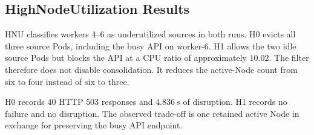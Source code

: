\subsection{HighNodeUtilization Results}
\label{subsec:actualusage4_hnu_results}
\begin{table}[H]
    \centering
    \caption{HighNodeUtilization Results}
    \label{tab:actualusage4_hnu}
    \renewcommand{\arraystretch}{1.2}
\end{table}

HNU classifies workers 4--6 as underutilized sources in both runs. H0 evicts all three source Pods, including the busy API on worker-6. H1 allows the two idle source Pods but blocks the API at a CPU ratio of approximately \(10.02\). The filter therefore does not disable consolidation. It reduces the active-Node count from six to four instead of six to three.

H0 records \(40\) HTTP \(503\) responses and \(4.836\,s\) of disruption. H1 records no failure and no disruption. The observed trade-off is one retained active Node in exchange for preserving the busy API endpoint.

